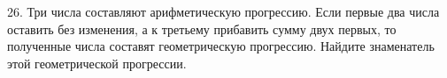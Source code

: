 26. Три числа составляют арифметическую прогрессию. Если первые два числа оставить без изменения, а к третьему прибавить сумму двух первых, то полученные числа составят геометрическую прогрессию. Найдите знаменатель этой геометрической прогрессии.\\

